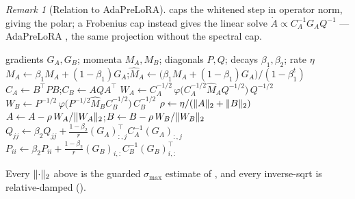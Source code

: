 \documentclass[11pt]{article}
\newcommand{\smax}{\sigma_{\max}}
\DeclarePairedDelimiter{\norm}{\lVert}{\rVert}
\newcommand{\polar}{\varphi}                 %
\newcommand{\methodname}{\textsc{Polar-LoRA}\xspace}
\theoremstyle{plain}
\theoremstyle{definition}
\theoremstyle{remark}
\newtheorem{remark}{Remark}
\begin{document}
\begin{remark}[Relation to AdaPreLoRA]
 caps the whitened step in operator norm, giving the polar; a Frobenius cap instead gives the linear solve $\dot A\propto C_A^{-1}G_A Q^{-1}$ --- AdaPreLoRA \cite{adaprelora}, the same projection without the spectral cap.
\end{remark}

\begin{algorithm}[t]
\caption{\methodname{} step for one LoRA pair $(A,B)$ at iteration $t$}
\label{alg:ours}
\begin{algorithmic}[1]
\Require gradients $G_A,G_B$; momenta $M_A,M_B$; diagonals $P,Q$; decays $\beta_1,\beta_2$; rate $\eta$
\State $M_A\gets\beta_1 M_A+(1-\beta_1)G_A$;\quad $\hat M_A\gets\big(\beta_1 M_A+(1-\beta_1)G_A\big)/(1-\beta_1^{t})$ 
\State $C_A\gets B^\top P B$;\quad $C_B\gets A Q A^\top$ 
\State $W_A\gets C_A^{-1/2}\,\polar\!\big(C_A^{-1/2}\hat M_A Q^{-1/2}\big)\,Q^{-1/2}$
\State $W_B\gets P^{-1/2}\,\polar\!\big(P^{-1/2}\hat M_B C_B^{-1/2}\big)\,C_B^{-1/2}$
\State $\rho\gets\eta/(\norm{A}_2+\norm{B}_2)$
\State $A\gets A-\rho\,W_A/\norm{W_A}_2$;\quad $B\gets B-\rho\,W_B/\norm{W_B}_2$
\State $Q_{jj}\gets\beta_2 Q_{jj}+\tfrac{1-\beta_2}{r}(G_A)_{:,j}^\top C_A^{-1}(G_A)_{:,j}$
\State $P_{ii}\gets\beta_2 P_{ii}+\tfrac{1-\beta_2}{r}(G_B)_{i,:}C_B^{-1}(G_B)_{i,:}^\top$
\end{algorithmic}
\end{algorithm}
\noindent Every $\norm{\cdot}_2$ above is the guarded $\smax$ estimate of , and every inverse-sqrt is relative-damped ().
\end{document}
